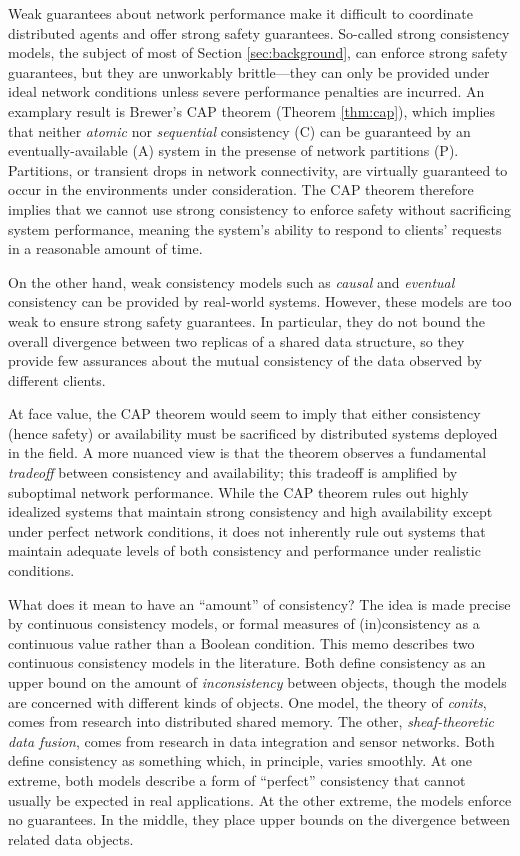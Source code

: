 \documentclass[]             %
{NASA}                       %
\theoremstyle{definition}
\begin{document}
Weak guarantees about network performance make it difficult to
coordinate distributed agents and offer strong safety guarantees.
So-called strong consistency models, the subject of most of Section
\ref{sec:background}, can enforce strong safety guarantees, but they are
unworkably brittle---they can only be provided under ideal network
conditions unless severe performance penalties are incurred. An
examplary result is Brewer's CAP theorem (Theorem \ref{thm:cap}), which
implies that neither \emph{atomic} nor \emph{sequential} consistency (C)
can be guaranteed by an eventually-available (A) system in the presense
of network partitions (P). Partitions, or transient drops in network
connectivity, are virtually guaranteed to occur in the environments
under consideration. The CAP theorem therefore implies that we cannot
use strong consistency to enforce safety without sacrificing system
performance, meaning the system's ability to respond to clients'
requests in a reasonable amount of time.

On the other hand, weak consistency models such as \emph{causal} and
\emph{eventual} consistency can be provided by real-world systems.
However, these models are too weak to ensure strong safety guarantees.
In particular, they do not bound the overall divergence between two
replicas of a shared data structure, so they provide few assurances
about the mutual consistency of the data observed by different clients.

At face value, the CAP theorem would seem to imply that either
consistency (hence safety) or availability must be sacrificed by
distributed systems deployed in the field. A more nuanced view is that
the theorem observes a fundamental \emph{tradeoff} between consistency
and availability; this tradeoff is amplified by suboptimal network
performance. While the CAP theorem rules out highly idealized systems
that maintain strong consistency and high availability except under
perfect network conditions, it does not inherently rule out systems that
maintain adequate levels of both consistency and performance under
realistic conditions.

What does it mean to have an ``amount'' of consistency? The idea is made
precise by continuous consistency models, or formal measures of
(in)consistency as a continuous value rather than a Boolean condition.
This memo describes two continuous consistency models in the literature.
Both define consistency as an upper bound on the amount of
\emph{inconsistency} between objects, though the models are concerned
with different kinds of objects. One model, the theory of \emph{conits},
comes from research into distributed shared memory. The other,
\emph{sheaf-theoretic data fusion}, comes from research in data
integration and sensor networks. Both define consistency as something
which, in principle, varies smoothly. At one extreme, both models
describe a form of ``perfect'' consistency that cannot usually be
expected in real applications. At the other extreme, the models enforce
no guarantees. In the middle, they place upper bounds on the divergence
between related data objects.
\end{document}
